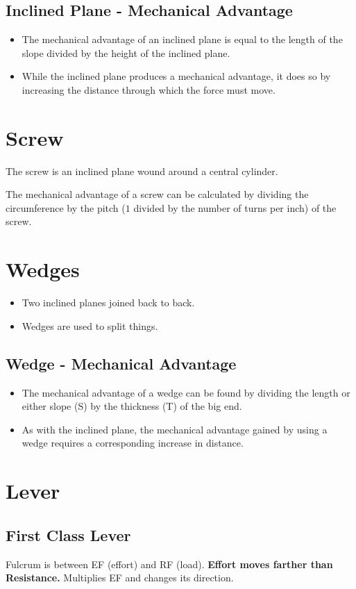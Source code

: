 \documentclass{article}
\begin{document}
\subsection{Inclined Plane - Mechanical Advantage}
\begin{itemize}
    \item The mechanical advantage of an inclined plane is equal to the length of the slope divided by the height of the inclined plane.
    \item While the inclined plane produces a mechanical advantage, it does so by increasing the distance through which the force must move.
\end{itemize}
\section{Screw}
The screw is an inclined plane wound around a central cylinder.

\bigskip \noindent The mechanical advantage of a screw can be calculated by dividing the circumference by the pitch ($1$ divided by the number of turns per inch) of the screw.
\section{Wedges}
\begin{itemize}
    \item Two inclined planes joined back to back.
    \item Wedges are used to split things.
\end{itemize}
\subsection{Wedge - Mechanical Advantage}
\begin{itemize}
    \item The mechanical advantage of a wedge can be found by dividing the length or either slope (S) by the thickness (T) of the big end.
    \item As with the inclined plane, the mechanical advantage gained by using a wedge requires a corresponding increase in distance. 
\end{itemize}
\section{Lever}
\subsection{First Class Lever}
Fulcrum is between EF (effort) and RF (load). \textbf{Effort moves farther than Resistance.} Multiplies EF and changes its direction.
\end{document}
